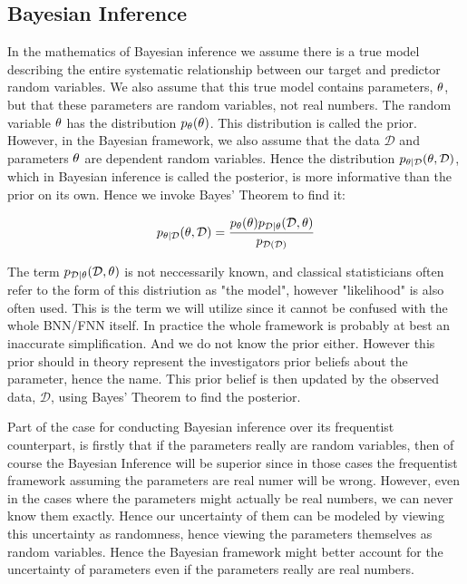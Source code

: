 \documentclass[nofootinbib,UKenglish,nobalancelastpage,12pt]{article}
\newcommand{\vect}{\ensuremath{\mathbf}}
\begin{document}
\subsection{Bayesian Inference}
In the mathematics of Bayesian inference we assume there is a true model describing the entire systematic relationship between our target and predictor random variables. We also assume that this true model contains parameters, $\vect{\theta}$, but that these parameters are random variables, not real numbers. The random variable $\vect{\theta}$ has the distribution $p_{\vect{\theta}}(\vect{\theta})$. This distribution is called the prior. However, in the Bayesian framework, we also assume that the data $\mathcal{D}$ and parameters $\vect{\theta}$ are dependent random variables. Hence the distribution $p_{\vect{\theta}|\mathcal{D}}(\vect{\theta},\mathcal{D})$, which in Bayesian inference is called the posterior, is more informative than the prior on its own. Hence we invoke Bayes' Theorem to find it:

$$
p_{\vect{\theta}|\mathcal{D}}(\vect{\theta},\mathcal{D}) = 
\frac{ p_{\vect{\theta}}(\theta)p_{\mathcal{D}|\vect{\theta}}(\mathcal{D},\vect{\theta}) }{p_{\mathcal{D}(\mathcal{D})}}
$$

The term $p_{\mathcal{D}|\vect{\theta}}(\mathcal{D},\vect{\theta})$ is not neccessarily known, and classical statisticians often refer to the form of this distriution as "the model", however "likelihood" is also often used. This is the term we will utilize since it cannot be confused with the whole BNN/FNN itself. In practice the whole framework is probably at best an inaccurate simplification. And we do not know the prior either. However this prior should in theory represent the investigators prior beliefs about the parameter, hence the name. This prior belief is then updated by the observed data, $\mathcal{D}$, using Bayes' Theorem to find the posterior. 

Part of the case for conducting Bayesian inference over its frequentist counterpart, is firstly that if the parameters really are random variables, then of course the Bayesian Inference will be superior since in those cases the frequentist framework assuming the parameters are real numer will be wrong. However, even in the cases where the parameters might actually be real numbers, we can never know them exactly. Hence our uncertainty of them can be modeled by viewing this uncertainty as randomness, hence viewing the parameters themselves as random variables. Hence the Bayesian framework might better account for the uncertainty of parameters even if the parameters really are real numbers.
\clearpage
\end{document}
